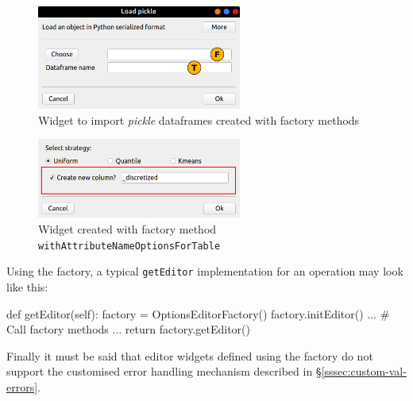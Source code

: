 \begin{figure}[hb]
	\centering
	\includegraphics[width=0.6\textwidth]{editor-detail-file}
	\caption{Widget to import \textit{pickle} dataframes created with factory methods}
	\label{fig:editor-detail-file}
\end{figure}
\begin{figure}[hb]
	\centering
	\includegraphics[width=0.6\textwidth]{editor-detail-name}
	\caption[Widget created with a factory method]{Widget created with factory method \texttt{withAttributeNameOptionsForTable}}
	\label{fig:editor-detail-name}
\end{figure}
Using the factory, a typical \texttt{getEditor} implementation for an operation may look like this:
\begin{python}[emph={initEditor, getEditor}]
	def getEditor(self):
	factory = OptionsEditorFactory()
	factory.initEditor()
	...
	# Call factory methods
	...
	return factory.getEditor()
\end{python}
Finally it must be said that editor widgets defined using the factory do not support the customised error handling mechanism described in §\ref{sssec:custom-val-errors}.

\clearpage
